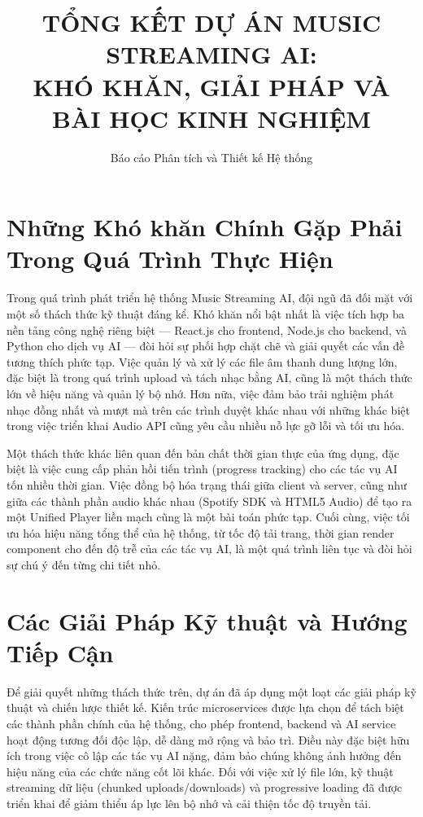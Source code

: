 \documentclass[12pt,a4paper]{article}
\title{\textbf{TỔNG KẾT DỰ ÁN MUSIC STREAMING AI: \\ KHÓ KHĂN, GIẢI PHÁP VÀ BÀI HỌC KINH NGHIỆM}}
\author{Báo cáo Phân tích và Thiết kế Hệ thống}
\date{}
\begin{document}
\maketitle

\section{Những Khó khăn Chính Gặp Phải Trong Quá Trình Thực Hiện}

Trong quá trình phát triển hệ thống Music Streaming AI, đội ngũ đã đối mặt với một số thách thức kỹ thuật đáng kể. Khó khăn nổi bật nhất là việc tích hợp ba nền tảng công nghệ riêng biệt --- React.js cho frontend, Node.js cho backend, và Python cho dịch vụ AI --- đòi hỏi sự phối hợp chặt chẽ và giải quyết các vấn đề tương thích phức tạp. Việc quản lý và xử lý các file âm thanh dung lượng lớn, đặc biệt là trong quá trình upload và tách nhạc bằng AI, cũng là một thách thức lớn về hiệu năng và quản lý bộ nhớ. Hơn nữa, việc đảm bảo trải nghiệm phát nhạc đồng nhất và mượt mà trên các trình duyệt khác nhau với những khác biệt trong việc triển khai Audio API cũng yêu cầu nhiều nỗ lực gỡ lỗi và tối ưu hóa.

Một thách thức khác liên quan đến bản chất thời gian thực của ứng dụng, đặc biệt là việc cung cấp phản hồi tiến trình (progress tracking) cho các tác vụ AI tốn nhiều thời gian. Việc đồng bộ hóa trạng thái giữa client và server, cũng như giữa các thành phần audio khác nhau (Spotify SDK và HTML5 Audio) để tạo ra một Unified Player liền mạch cũng là một bài toán phức tạp. Cuối cùng, việc tối ưu hóa hiệu năng tổng thể của hệ thống, từ tốc độ tải trang, thời gian render component cho đến độ trễ của các tác vụ AI, là một quá trình liên tục và đòi hỏi sự chú ý đến từng chi tiết nhỏ.

\section{Các Giải Pháp Kỹ thuật và Hướng Tiếp Cận}

Để giải quyết những thách thức trên, dự án đã áp dụng một loạt các giải pháp kỹ thuật và chiến lược thiết kế. Kiến trúc microservices được lựa chọn để tách biệt các thành phần chính của hệ thống, cho phép frontend, backend và AI service hoạt động tương đối độc lập, dễ dàng mở rộng và bảo trì. Điều này đặc biệt hữu ích trong việc cô lập các tác vụ AI nặng, đảm bảo chúng không ảnh hưởng đến hiệu năng của các chức năng cốt lõi khác. Đối với việc xử lý file lớn, kỹ thuật streaming dữ liệu (chunked uploads/downloads) và progressive loading đã được triển khai để giảm thiểu áp lực lên bộ nhớ và cải thiện tốc độ truyền tải.
\end{document}
